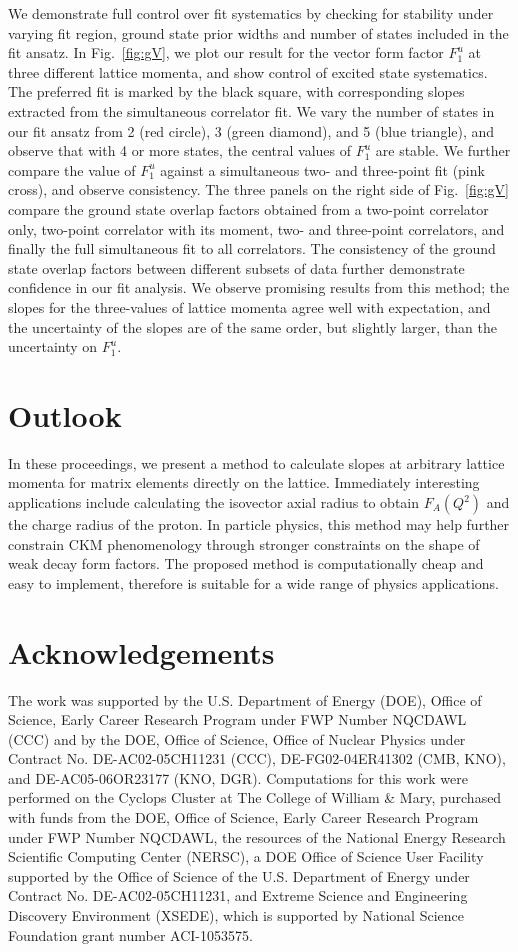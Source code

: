 \documentclass{PoS}
\begin{document}
We demonstrate full control over fit systematics by checking for stability under varying fit region, ground state prior widths and number of states included in the fit ansatz. In Fig.~\ref{fig:gV}, we plot our result for the vector form factor $F^u_1$ at three different lattice momenta, and show control of excited state systematics.  The preferred fit is marked by the black square, with corresponding slopes extracted from the simultaneous correlator fit. We vary the number of states in our fit ansatz from 2 (red circle), 3 (green diamond), and 5 (blue triangle), and observe that with 4 or more states, the central values of $F_1^u$ are stable. We further compare the value of $F_1^u$ against a simultaneous two- and three-point fit (pink cross), and observe consistency. The three panels on the right side of Fig.~\ref{fig:gV} compare the ground state overlap factors obtained from a two-point correlator only, two-point correlator with its moment, two- and three-point correlators, and finally the full simultaneous fit to all correlators.  The consistency of the ground state overlap factors between different subsets of data further demonstrate confidence in our fit analysis. We observe promising results from this method; the slopes for the three-values of lattice momenta agree well with expectation, and the uncertainty of the slopes are of the same order, but slightly larger, than the uncertainty on $F_1^u$.

\section{Outlook}
In these proceedings, we present a method to calculate slopes at arbitrary lattice momenta for matrix elements directly on the lattice.  Immediately interesting applications include calculating the isovector axial radius to obtain $F_A(Q^2)$ and the charge radius of the proton.  In particle physics, this method may help further constrain CKM phenomenology through stronger constraints on the shape of weak decay form factors. The proposed method is computationally cheap and  easy to implement, therefore is suitable for a wide range of physics applications.

\section{Acknowledgements}
The work was supported by the U.S. Department of Energy (DOE), Office of Science, Early Career Research Program under FWP Number NQCDAWL (CCC) and by the DOE, Office of Science, Office of Nuclear Physics under Contract No. DE-AC02-05CH11231 (CCC), DE-FG02-04ER41302 (CMB, KNO), and DE-AC05-06OR23177 (KNO, DGR).  Computations for this work were performed on the Cyclops Cluster at The College of William \& Mary, purchased with funds from the DOE, Office of Science, Early Career Research Program under FWP Number NQCDAWL, the resources of the National Energy Research Scientific Computing Center (NERSC), a DOE Office of Science User Facility supported by the Office of Science of the U.S. Department of Energy under Contract No. DE-AC02-05CH11231, and Extreme Science and Engineering Discovery Environment (XSEDE), which is supported by National Science Foundation grant number ACI-1053575.



\end{document}
